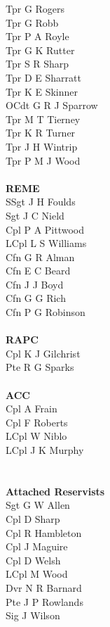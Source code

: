 \begin{multicols}{3}
  Tpr G Rogers \\
  Tpr G Robb \\
  Tpr P A Royle \\
  Tpr G K Rutter \\
  Tpr S R Sharp \\
  Tpr D E Sharratt \\
  Tpr K E Skinner \\
  OCdt G R J Sparrow \\
  Tpr M T Tierney \\
  Tpr K R Turner \\
  Tpr J H Wintrip \\
  Tpr P M J Wood \\
  \\
  \textbf{REME} \\
  SSgt J H Foulds \\
  Sgt J C Nield \\
  Cpl P A Pittwood \\
  LCpl L S Williams \\
  Cfn G R Alman \\
  Cfn E C Beard \\
  Cfn J J Boyd \\
  Cfn G G Rich \\
  Cfn P G Robinson \\
  \\
  \textbf{RAPC} \\
  Cpl K J Gilchrist \\
  Pte R G Sparks \\
  \\
  \textbf{ACC} \\
  Cpl A Frain \\
  Cpl F Roberts \\
  LCpl W Niblo \\
  LCpl J K Murphy \\
  \\
  \\
  \textbf{Attached Reservists} \\
  Sgt G W Allen \\
  Cpl D Sharp \\
  Cpl R Hambleton \\
  Cpl J Maguire \\
  Cpl D Welsh \\
  LCpl M Wood \\
  Dvr N R Barnard \\
  Pte J P Rowlands \\
  Sig J Wilson \\

\end{multicols}
